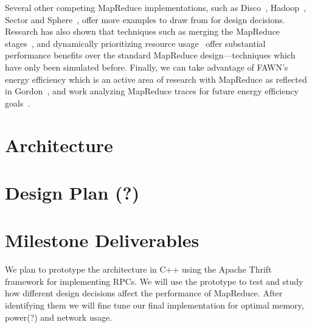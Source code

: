 \documentclass[10pt,letter,final,article,twocolumn]{article} %
\begin{document}
Several other competing MapReduce implementations, such as
Disco~\cite{disco10}, Hadoop~\cite{hadoop10}, Sector and
Sphere~\cite{sphere09}, offer more examples to draw from for design
decisions.  Research has also shown that techniques such as merging the
MapReduce stages~\cite{barrier10}, and dynamically prioritizing resource
usage~\cite{sandholm09} offer substantial performance benefits over the
standard MapReduce design---techniques which have only been simulated
before.  Finally, we can take advantage of FAWN's energy efficiency which is
an active area of research with MapReduce as reflected in
Gordon~\cite{gordon09},  and work analyzing MapReduce traces for future
energy efficiency goals~\cite{chen10}.

\section{Architecture}

\section{Design Plan (?)}

\section{Milestone Deliverables}
We plan to prototype the architecture in C++ using the Apache Thrift framework for implementing RPCs. We will use the prototype to test and study how different design decisions affect the performance of MapReduce. After identifying them we will fine tune our final implementation for optimal memory, power(?) and network usage.




\end{document}
